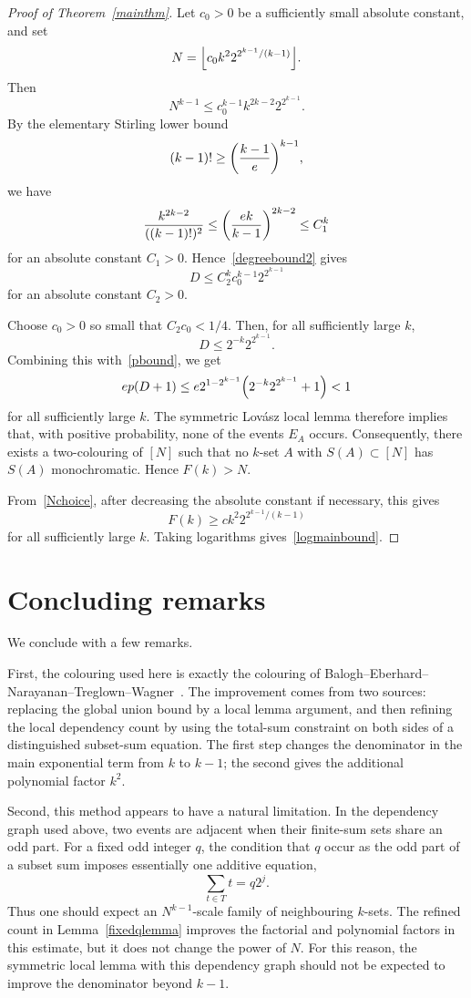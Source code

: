 \documentclass[12pt,a4paper,english,reqno]{amsart}
\theoremstyle{plain}
\theoremstyle{remark}
\let\originalleft\left
\let\originalright\right
\renewcommand{\left}{\mathopen{}\mathclose\bgroup\originalleft}
\renewcommand{\right}{\aftergroup\egroup\originalright}
\begin{document}
\begin{proof}[Proof of Theorem~\ref{mainthm}]
Let $c_0>0$ be a sufficiently small absolute constant, and set
\begin{equation}\label{Nchoice}
N=\left\lfloor c_0 k^2 2^{2^{k-1}/(k-1)}\right\rfloor.
\end{equation}
Then
\[
N^{k-1}\le c_0^{k-1}k^{2k-2}2^{2^{k-1}}.
\]
By the elementary Stirling lower bound
\[
(k-1)!\ge \left(\frac{k-1}{e}\right)^{k-1},
\]
we have
\[
\frac{k^{2k-2}}{((k-1)!)^2}
\le
\left(\frac{ek}{k-1}\right)^{2k-2}
\le C_1^k
\]
for an absolute constant $C_1>0$. Hence~\eqref{degreebound2} gives
\begin{equation}\label{Dfinal}
D\le C_2^k c_0^{k-1}2^{2^{k-1}}
\end{equation}
for an absolute constant $C_2>0$.

Choose $c_0>0$ so small that $C_2c_0<1/4$. Then, for all sufficiently large $k$,
\[
D\le 2^{-k}2^{2^{k-1}}.
\]
Combining this with~\eqref{pbound}, we get
\[
ep(D+1)
\le
e2^{1-2^{k-1}}\left(2^{-k}2^{2^{k-1}}+1\right)<1
\]
for all sufficiently large $k$. The symmetric Lov\'{a}sz local lemma therefore implies that, with positive probability, none of the events $E_A$ occurs. Consequently, there exists a two-colouring of $[N]$ such that no $k$-set $A$ with $S(A)\subset[N]$ has $S(A)$ monochromatic. Hence $F(k)>N$.

From~\eqref{Nchoice}, after decreasing the absolute constant if necessary, this gives
\[
F(k)\ge c k^2 2^{2^{k-1}/(k-1)}
\]
for all sufficiently large $k$. Taking logarithms gives~\eqref{logmainbound}.
\end{proof}

\section{Concluding remarks}\label{conc}

We conclude with a few remarks.

First, the colouring used here is exactly the colouring of Balogh--Eberhard--Narayanan--Treglown--Wagner~\cite{BENTW}. The improvement comes from two sources: replacing the global union bound by a local lemma argument, and then refining the local dependency count by using the total-sum constraint on both sides of a distinguished subset-sum equation. The first step changes the denominator in the main exponential term from $k$ to $k-1$; the second gives the additional polynomial factor $k^2$.

Second, this method appears to have a natural limitation. In the dependency graph used above, two events are adjacent when their finite-sum sets share an odd part. For a fixed odd integer $q$, the condition that $q$ occur as the odd part of a subset sum imposes essentially one additive equation,
\[
\sum_{t\in T}t=q2^j.
\]
Thus one should expect an $N^{k-1}$-scale family of neighbouring $k$-sets. The refined count in Lemma~\ref{fixedqlemma} improves the factorial and polynomial factors in this estimate, but it does not change the power of $N$. For this reason, the symmetric local lemma with this dependency graph should not be expected to improve the denominator beyond $k-1$.
\end{document}
